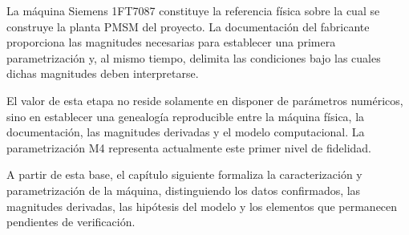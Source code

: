 La máquina Siemens 1FT7087 constituye la referencia física sobre la cual se construye la planta PMSM del proyecto. La documentación del fabricante proporciona las magnitudes necesarias para establecer una primera parametrización y, al mismo tiempo, delimita las condiciones bajo las cuales dichas magnitudes deben interpretarse.

El valor de esta etapa no reside solamente en disponer de parámetros numéricos, sino en establecer una genealogía reproducible entre la máquina física, la documentación, las magnitudes derivadas y el modelo computacional. La parametrización M4 representa actualmente este primer nivel de fidelidad.

A partir de esta base, el capítulo siguiente formaliza la caracterización y parametrización de la máquina, distinguiendo los datos confirmados, las magnitudes derivadas, las hipótesis del modelo y los elementos que permanecen pendientes de verificación.
